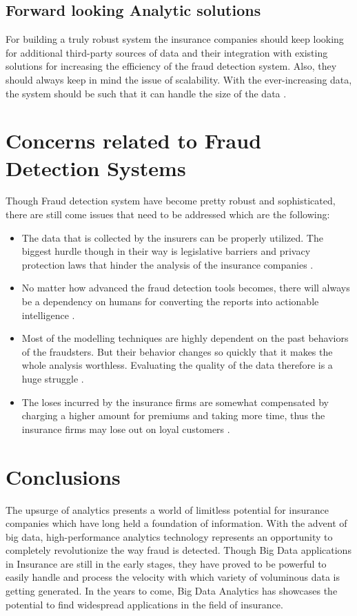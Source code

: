 \documentclass[sigconf]{acmart}
\begin{document}
\subsection{Forward looking Analytic solutions}
For building a truly robust system the insurance companies should keep looking for additional third-party sources of data and their integration with existing solutions for increasing the efficiency of the fraud detection system. Also, they should always keep in mind the issue of scalability. With the ever-increasing data, the system should be such that it can handle the size of the data \cite{link7}.

\section{Concerns related to Fraud Detection Systems}
Though Fraud detection system have become pretty robust and sophisticated, there are still come issues that need to be addressed which are the following:
\begin{itemize}
  \item The data that is collected by the insurers can be properly utilized. The biggest hurdle though in their way is legislative barriers and privacy protection laws that  hinder the analysis of the insurance companies \cite{link8}.
  \item No matter how advanced the fraud detection tools becomes, there will always be a dependency on humans for converting the reports into actionable intelligence \cite{link8}.
  \item Most of the modelling techniques are highly dependent on the past behaviors of the fraudsters. But their behavior changes so quickly that it makes the whole analysis worthless. Evaluating the quality of the data therefore is a huge struggle \cite{link11}.
  \item The loses incurred by the insurance firms are somewhat compensated by charging a higher amount for premiums and taking more time, thus the insurance firms may lose out on loyal customers \cite{link8}.
\end{itemize} 


\section{Conclusions}
The upsurge of analytics presents a world of limitless potential for insurance companies which have long held a foundation of information.  With the advent of big data, high-performance analytics technology represents an opportunity to completely revolutionize the way fraud is detected. Though Big Data applications in Insurance are still in the early stages, they have proved to be powerful to easily handle and process the velocity with which variety of voluminous data is getting generated. In the years to come, Big Data Analytics has showcases the potential to find widespread applications in the field of insurance.


 
\end{document}
